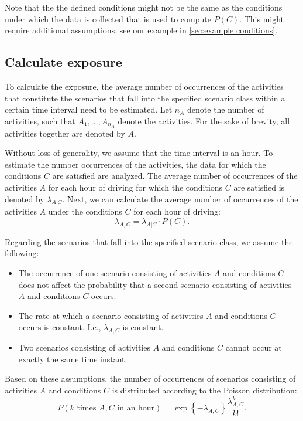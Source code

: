 Note that the the defined conditions might not be the same as the conditions under which the data is collected that is used to compute $P(C)$. This might require additional assumptions, see our example in \cref{sec:example conditions}.



\subsection{Calculate exposure}
\label{sec:exposure}

To calculate the exposure, the average number of occurrences of the activities that constitute the scenarios that fall into the specified scenario class within a certain time interval need to be estimated. Let $n_A$ denote the number of activities, such that $A_1, \ldots, A_{n_A}$ denote the activities. For the sake of brevity, all activities together are denoted by $A$. 

Without loss of generality, we assume that the time interval is an hour. To estimate the number occurrences of the activities, the data for which the conditions $C$ are satisfied are analyzed. The average number of occurrences of the activities $A$ for each hour of driving for which the conditions $C$ are satisfied is denoted by $\lambda_{A|C}$. Next, we can calculate the average number of occurrences of the activities $A$ under the conditions $C$ for each hour of driving:
\begin{equation}
	\lambda_{A,C} = \lambda_{A|C} \cdot P(C).
\end{equation}

Regarding the scenarios that fall into the specified scenario class, we assume the following:
\begin{itemize}
	\item The occurrence of one scenario consisting of activities $A$ and conditions $C$ does not affect the probability that a second scenario consisting of activities $A$ and conditions $C$ occurs.
	\item The rate at which a scenario consisting of activities $A$ and conditions $C$ occurs is constant. I.e., $\lambda_{A,C}$ is constant.
	\item Two scenarios consisting of activities $A$ and conditions $C$ cannot occur at exactly the same time instant.
\end{itemize}
Based on these assumptions, the number of occurrences of scenarios consisting of activities $A$ and conditions $C$ is distributed according to the Poisson distribution:
\begin{equation}
	P(k\text{ times }A,C\text{ in an hour}) = \exp \left\{-\lambda_{A,C} \right\} \frac{\lambda_{A,C}^k}{k!}.
\end{equation}



